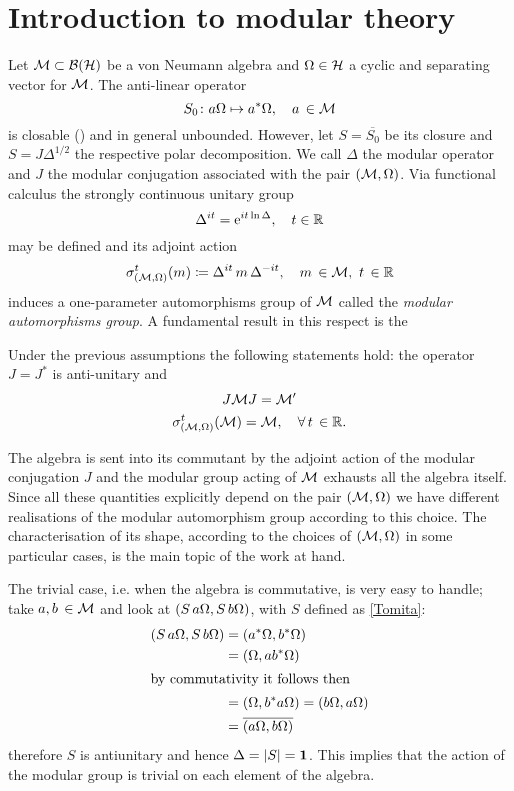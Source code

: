 \section{Introduction to modular theory}
\label{Introduction to modular theory}
Let $\mathcal{M}\subset\mathcal{B}(\mathcal{H})$ be a von Neumann algebra and
$\Omega\in\mathcal{H}$ a cyclic and separating vector for $\mathcal{M}$.
The anti-linear operator
\begin{equation}
\label{Tomita}
S_0\colon a\Omega\mapsto a^*\Omega,\quad a\,\in\mathcal{M}
\end{equation}
is closable (\cite*{BR:1979}) and in general unbounded. 
However, let $S=\overline{S_0}$ be
its closure and $S=J{\Delta}^{1/2}$ the respective polar
decomposition. We call $\Delta$ the modular operator and 
$J$ the modular conjugation associated with the pair
$(\mathcal{M},\Omega)$. Via functional calculus the
strongly continuous unitary group 
\[
\Delta^{it}=\operatorname{e}^{it \ln\Delta},\quad t\in\mathbb{R}
\]
may be defined and its adjoint action
\begin{equation}
\label{modular group}
\sigma^t_{(\mathcal{M},\Omega)}(m)\coloneqq \Delta^{it}\,m\,\Delta^{-it},
\quad m\,\in\mathcal{M},\ t\,\in\mathbb{R}
\end{equation}
induces a one-parameter automorphisms group of $\mathcal{M}$ called
the \emph{modular automorphisms group}. 
A fundamental result in this respect is the

 \begin{theorem}
 Under the previous assumptions the following statements hold:
 the operator $J=J^*$ is anti-unitary and
  \begin{gather}
  J\mathcal{M} J={\mathcal{M}}'\\
  \sigma^t_{(\mathcal{M},\Omega)}(\mathcal{M})=\mathcal{M},\quad \forall\,t\,\in\mathbb{R}.
  \end{gather}
 \end{theorem}
The algebra is sent into its commutant by the adjoint action of the
modular conjugation $J$ and the modular group acting of $\mathcal{M}$
exhausts all the algebra itself. Since all these quantities
explicitly depend on the pair $(\mathcal{M},\Omega)$ we have different
realisations of the modular automorphism group according to this choice. 
The characterisation of its shape, according to the choices 
of $(\mathcal{M},\Omega)$ in some particular cases, is the main topic 
of the work at hand.

 \bigskip
 The trivial case, i.e. when the algebra is commutative, is very
 easy to handle; take $a,b\,\in\mathcal{M}$ and look at 
 $(S\,a\Omega,S\,b\Omega)$, with $S$ defined as \eqref{Tomita}:
 \begin{align*}
 (S\,a\Omega,S\,b\Omega)&=(a^*\Omega,b^*\Omega)\\
 &=(\Omega, ab^*\Omega)\\
 \intertext{by commutativity it follows then}
 &=(\Omega, b^*a\Omega)=(b\Omega, a\Omega)\\
 &=\overline{(a\Omega,b\Omega)}
 \end{align*}
 therefore $S$ is antiunitary and hence $\Delta=\lvert S\rvert=\bm{1}$.
 This implies that the action of the modular group
 is trivial on each element of the algebra.


